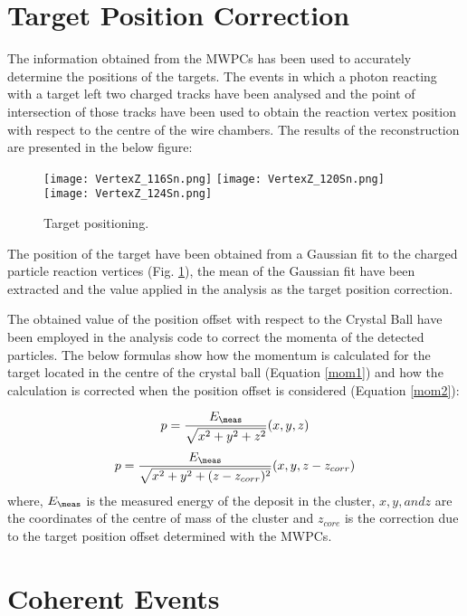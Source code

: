 \section{Target Position Correction}

\indent The information obtained from the MWPCs has been used to accurately determine the positions of the targets. The events in which a photon reacting with a target left two charged tracks have been analysed and the point of intersection of those tracks have been used to obtain the reaction vertex position with respect to the centre of the wire chambers. The results of the reconstruction are presented in the below figure:

\begin{figure}[H]
\begin{center}
\texttt{[image: VertexZ\_116Sn.png]}
\texttt{[image: VertexZ\_120Sn.png]}
\texttt{[image: VertexZ\_124Sn.png]}
\caption{Target positioning.}
\label{targetvertex}
\end{center}
\end{figure}

The position of the target have been obtained from a Gaussian fit to the charged particle reaction vertices (Fig. \ref{targetvertex}), the mean of the Gaussian fit have been extracted and the value applied in the analysis as the target position correction.

\indent The obtained value of the position offset with respect to the Crystal Ball have been employed in the analysis code to correct the momenta of the detected particles. The below formulas show how the momentum is calculated for the target located in the centre of the crystal ball (Equation \ref{mom1}) and how the calculation is corrected when the position offset is considered (Equation \ref{mom2}):

\begin{equation}
p = \frac{E_{\meas}}{\sqrt{x^{2}+y^{2}+z^{2}}}(x,y,z)
\label{mom1}
\end{equation}
\begin{equation}
p = \frac{E_{\meas}}{\sqrt{x^{2}+y^{2}+(z-z_{corr})^{2}}}(x,y,z-z_{corr})
\label{mom2}
\end{equation}
where, $E_{\meas}$ is the measured energy of the deposit in the cluster, $x, y, and z$ are the coordinates of the centre of mass of the cluster and $z_{core}$ is the correction due to the target position offset determined with the MWPCs.

\section{Coherent Events}

